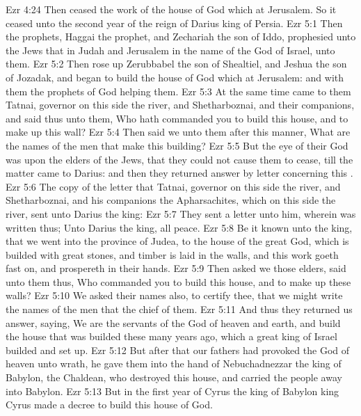 \vs Ezr 4:24 Then ceased the work of the house of God which  at Jerusalem. So it ceased unto the second year of the reign of Darius king of Persia.
\vs Ezr 5:1 Then the prophets, Haggai the prophet, and Zechariah the son of Iddo, prophesied unto the Jews that  in Judah and Jerusalem in the name of the God of Israel,  unto them.
\vs Ezr 5:2 Then rose up Zerubbabel the son of Shealtiel, and Jeshua the son of Jozadak, and began to build the house of God which  at Jerusalem: and with them  the prophets of God helping them.
\vs Ezr 5:3 At the same time came to them Tatnai, governor on this side the river, and Shetharboznai, and their companions, and said thus unto them, Who hath commanded you to build this house, and to make up this wall?
\vs Ezr 5:4 Then said we unto them after this manner, What are the names of the men that make this building?
\vs Ezr 5:5 But the eye of their God was upon the elders of the Jews, that they could not cause them to cease, till the matter came to Darius: and then they returned answer by letter concerning this .
\vs Ezr 5:6 The copy of the letter that Tatnai, governor on this side the river, and Shetharboznai, and his companions the Apharsachites, which  on this side the river, sent unto Darius the king:
\vs Ezr 5:7 They sent a letter unto him, wherein was written thus; Unto Darius the king, all peace.
\vs Ezr 5:8 Be it known unto the king, that we went into the province of Judea, to the house of the great God, which is builded with great stones, and timber is laid in the walls, and this work goeth fast on, and prospereth in their hands.
\vs Ezr 5:9 Then asked we those elders,  said unto them thus, Who commanded you to build this house, and to make up these walls?
\vs Ezr 5:10 We asked their names also, to certify thee, that we might write the names of the men that  the chief of them.
\vs Ezr 5:11 And thus they returned us answer, saying, We are the servants of the God of heaven and earth, and build the house that was builded these many years ago, which a great king of Israel builded and set up.
\vs Ezr 5:12 But after that our fathers had provoked the God of heaven unto wrath, he gave them into the hand of Nebuchadnezzar the king of Babylon, the Chaldean, who destroyed this house, and carried the people away into Babylon.
\vs Ezr 5:13 But in the first year of Cyrus the king of Babylon  king Cyrus made a decree to build this house of God.
